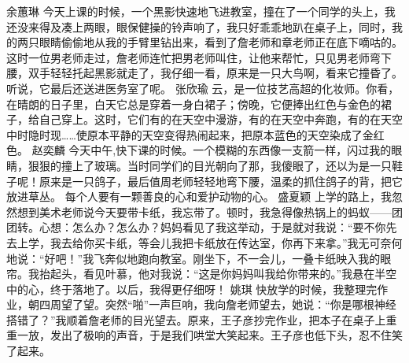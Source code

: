 \markdownRendererDocumentBegin
{}\markdownRendererInterblockSeparator
{}\markdownRendererInterblockSeparator
{}余蕙琳\markdownRendererInterblockSeparator
{}今天上课的时候，一个黑影快速地飞进教室，撞在了一个同学的头上，我还没来得及凑上两眼，眼保健操的铃声响了，我只好乖乖地趴在桌子上，同时，我的两只眼睛偷偷地从我的手臂里钻出来，看到了詹老师和章老师正在底下嘀咕的。这时一位男老师走过，詹老师连忙把男老师叫住，让他来帮忙，只见男老师弯下腰，双手轻轻托起黑影就走了，我仔细一看，原来是一只大鸟啊，看来它撞昏了。听说，它最后还送进医务室了呢。\markdownRendererInterblockSeparator
{}\markdownRendererInterblockSeparator
{}张欣瑜\markdownRendererInterblockSeparator
{}云，是一位技艺高超的化妆师。你看，在晴朗的日子里，白天它总是穿着一身白裙子；傍晚，它便捧出红色与金色的裙子，给自己穿上。这时，它们有的在天空中漫游，有的在天空中奔跑，有的在天空中时隐时现……使原本平静的天空变得热闹起来，把原本蓝色的天空染成了金红色。\markdownRendererInterblockSeparator
{}\markdownRendererInterblockSeparator
{}赵奕麟\markdownRendererInterblockSeparator
{}今天中午,快下课的时候。一个模糊的东西像一支箭一样，闪过我的眼睛，狠狠的撞上了玻璃。当时同学们的目光朝向了那，我傻眼了，还以为是一只鞋子呢！原来是一只鸽子，最后值周老师轻轻地弯下腰，温柔的抓住鸽子的背，把它放进草丛。\markdownRendererInterblockSeparator
{}每个人要有一颗善良的心和爱护动物的心。\markdownRendererInterblockSeparator
{}\markdownRendererInterblockSeparator
{}盛夏颖\markdownRendererInterblockSeparator
{}上学的路上，我忽然想到美术老师说今天要带卡纸，我忘带了。顿时，我急得像热锅上的蚂蚁——团团转。心想：怎么办？怎么办？妈妈看见了我这举动，于是就对我说：“要不你先去上学，我去给你买卡纸，等会儿我把卡纸放在传达室，你再下来拿。”我无可奈何地说：“好吧！”我飞奔似地跑向教室。刚坐下，不一会儿，一叠卡纸映入我的眼帘。我抬起头，看见叶慕，他对我说：“这是你妈妈叫我给你带来的。”我悬在半空中的心，终于落地了。以后，我得更仔细呀！\markdownRendererInterblockSeparator
{}\markdownRendererInterblockSeparator
{}姚琪\markdownRendererInterblockSeparator
{}快放学的时候，我整理完作业，朝四周望了望。突然“啪”一声巨响，我向詹老师望去，她说：“你是哪根神经搭错了？”我顺着詹老师的目光望去。原来，王子彦抄完作业，把本子在桌子上重重一放，发出了极响的声音，于是我们哄堂大笑起来。王子彦也低下头，忍不住笑了起来。 \markdownRendererInterblockSeparator
{}\markdownRendererInterblockSeparator
